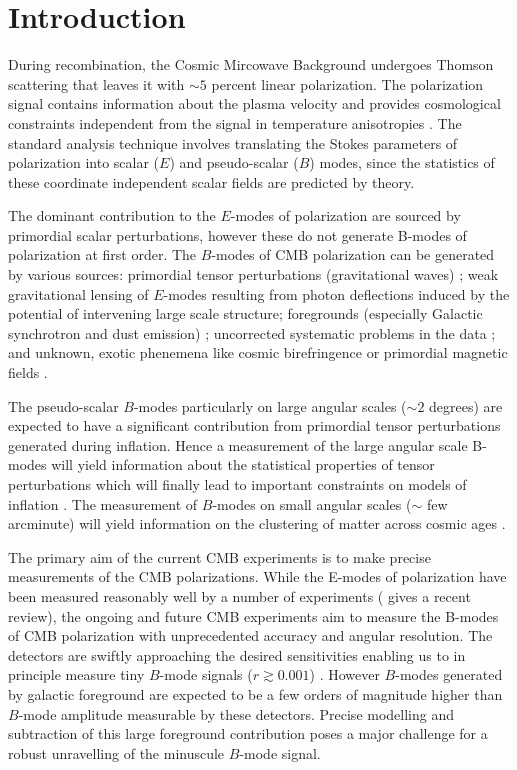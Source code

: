 \section{Introduction}
During recombination, the Cosmic Mircowave Background undergoes Thomson scattering that leaves it with $\sim 5$ percent linear polarization.  The polarization signal contains information about the plasma velocity and provides cosmological constraints independent from the signal in temperature anisotropies \citep{1997NewA....2..323H}.  The standard analysis technique involves translating the Stokes parameters of polarization into scalar ($E$) and pseudo-scalar ($B$) modes, since the statistics of these coordinate independent scalar fields are predicted by theory.   

The dominant contribution to the $E$-modes of polarization are sourced by primordial scalar perturbations, however these do not generate B-modes of polarization at first order. The $B$-modes of CMB polarization can be generated by various sources:
primordial tensor perturbations (gravitational waves)%
\citep{1997PhRvD..56..596H,1997PhRvL..78.2054S};
weak gravitational lensing of $E$-modes resulting from photon deflections induced by the potential of intervening large scale structure;
foregrounds (especially Galactic synchrotron and dust emission)
\citep{2016A&A...586A.133P};
uncorrected systematic problems in the data \citep{2003PhRvD..67d3004H,2008PhRvD..77h3003S};
and unknown, exotic phenemena like cosmic birefringence or primordial magnetic fields
\citep{1996ApJ...469....1K,1999PhRvL..83.1506L,2004ApJ...616....1C,2014MNRAS.438.2508P}.

The pseudo-scalar $B$-modes particularly on large angular scales ($\sim 2$ degrees) are expected to have a significant contribution from primordial tensor perturbations generated during inflation. Hence a measurement of the large angular scale B-modes will yield information about the statistical properties of tensor perturbations which will finally lead to important constraints on models of inflation \cite{?}. The measurement of $B$-modes on small angular scales ($\sim$ few arcminute) will yield information on the clustering of matter across cosmic ages \cite{?}.
  
The primary aim of the current CMB experiments is to make precise measurements of the CMB polarizations. While the E-modes of polarization have been measured reasonably well by a number of experiments (\cite{2018RPPh...81d4901S} gives a recent review), the ongoing and future CMB experiments aim to measure the B-modes of CMB polarization with unprecedented accuracy and angular resolution. The detectors are swiftly approaching the desired sensitivities enabling us to in principle measure tiny $B$-mode signals ($r\gtrsim 0.001$) \cite{s4 science book, pico mission study}. However $B$-modes generated by galactic foreground are expected to be a few orders of magnitude higher than $B$-mode amplitude measurable by these detectors.  Precise modelling and subtraction of this large foreground contribution poses a major challenge for a robust unravelling of the minuscule $B$-mode signal. 
 
